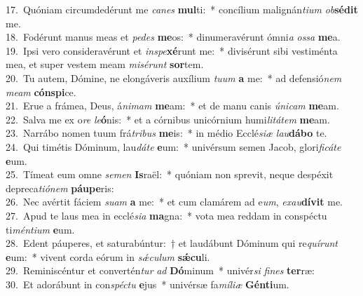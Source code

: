 {17.~}Quóniam circumdedérunt me \textit{ca}\textit{nes} \textbf{mul}ti:~* concílium malignán\textit{ti}\textit{um} \textit{ob}\textbf{sé}\textbf{dit} me.\\
{18.~}Fodérunt manus meas et \textit{pe}\textit{des} \textbf{me}os:~* dinumeravérunt ómni\textit{a} \textit{os}\textit{sa} \textbf{me}a.\\
{19.~}Ipsi vero consideravérunt et \textit{in}\textit{spe}\textbf{xé}runt me:~* divisérunt sibi vestiménta mea, et super vestem meam \textit{mi}\textit{sé}\textit{runt} \textbf{sor}tem.\\
{20.~}Tu autem, Dómine, ne elongáveris auxílium \textit{tu}\textit{um} \textbf{a} me:~* ad defensió\textit{nem} \textit{me}\textit{am} \textbf{cón}\textbf{spi}ce.\\
{21.~}Erue a frámea, Deus, á\textit{ni}\textit{mam} \textbf{me}am:~* et de manu canis \textit{ú}\textit{ni}\textit{cam} \textbf{me}am.\\
{22.~}Salva me ex o\textit{re} \textit{le}\textbf{ó}nis:~* et a córnibus unicórnium humi\textit{li}\textit{tá}\textit{tem} \textbf{me}am.\\
{23.~}Narrábo nomen tuum frá\textit{tri}\textit{bus} \textbf{me}is:~* in médio Ecclé\textit{si}\textit{æ} \textit{lau}\textbf{dá}\textbf{bo} te.\\
{24.~}Qui timétis Dóminum, lau\textit{dá}\textit{te} \textbf{e}um:~* univérsum semen Jacob, glori\textit{fi}\textit{cá}\textit{te} \textbf{e}um.\\
{25.~}Tímeat eum omne \textit{se}\textit{men} \textbf{Is}raël:~* quóniam non sprevit, neque despéxit depreca\textit{ti}\textit{ó}\textit{nem} \textbf{páu}\textbf{pe}ris:\\
{26.~}Nec avértit fáciem \textit{su}\textit{am} \textbf{a} me:~* et cum clamárem ad e\textit{um}, \textit{e}\textit{xau}\textbf{dí}\textbf{vit} me.\\
{27.~}Apud te laus mea in ecclé\textit{si}\textit{a} \textbf{ma}gna:~* vota mea reddam in conspéctu ti\textit{mén}\textit{ti}\textit{um} \textbf{e}um.\\
{28.~}Edent páuperes, et saturabúntur:~† et laudábunt Dóminum qui re\textit{quí}\textit{runt} \textbf{e}um:~* vivent corda eórum in \textit{sǽ}\textit{cu}\textit{lum} \textbf{sǽ}\textbf{cu}li.\\
{29.~}Reminiscéntur et convertén\textit{tur} \textit{ad} \textbf{Dó}minum~* univér\textit{si} \textit{fi}\textit{nes} \textbf{ter}ræ:\\
{30.~}Et adorábunt in con\textit{spé}\textit{ctu} \textbf{e}jus~* univérsæ fa\textit{mí}\textit{li}\textit{æ} \textbf{Gén}\textbf{ti}um.\\
